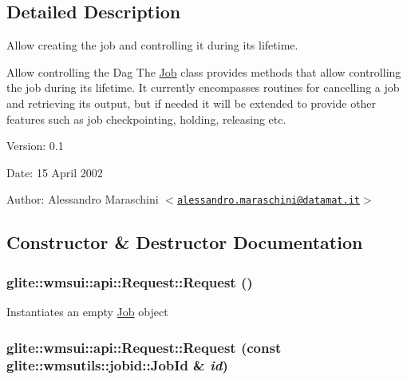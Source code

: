 \subsection{Detailed Description}
Allow creating the job and controlling it during its lifetime. 

Allow controlling the Dag The \hyperlink{classglite_1_1wmsui_1_1api_1_1Job}{Job} class provides methods that allow controlling the job during its lifetime. It currently encompasses routines for cancelling a job and retrieving its output, but if needed it will be extended to provide other features such as job checkpointing, holding, releasing etc.

\begin{Desc}
\item[Version:]0.1 \end{Desc}
\begin{Desc}
\item[Date:]15 April 2002 \end{Desc}
\begin{Desc}
\item[Author:]Alessandro Maraschini $<$\href{mailto:alessandro.maraschini@datamat.it}{\tt alessandro.maraschini@datamat.it}$>$ \end{Desc}




\subsection{Constructor \& Destructor Documentation}
\hypertarget{classglite_1_1wmsui_1_1api_1_1Request_z9_0}{
\subsubsection[Request]{\setlength{\rightskip}{0pt plus 5cm}glite::wmsui::api::Request::Request ()}}
\label{classglite_1_1wmsui_1_1api_1_1Request_z9_0}


Instantiates an empty \hyperlink{classglite_1_1wmsui_1_1api_1_1Job}{Job} object \hypertarget{classglite_1_1wmsui_1_1api_1_1Request_z9_1}{
\subsubsection[Request]{\setlength{\rightskip}{0pt plus 5cm}glite::wmsui::api::Request::Request (const glite::wmsutils::jobid::Job\-Id \& {\em id})}}
\label{classglite_1_1wmsui_1_1api_1_1Request_z9_1}


